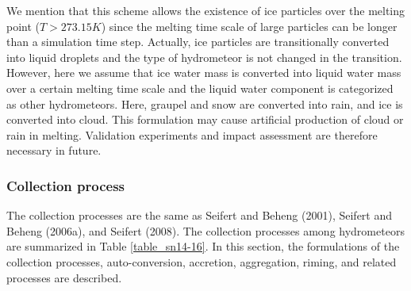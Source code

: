 We mention that this scheme allows the existence of ice particles over the melting point ($T>273.15 K$) since the melting time scale of large particles can be longer than a simulation time step. Actually, ice particles are transitionally converted into liquid droplets and the type of hydrometeor is not changed in the transition. However, here we assume that ice water mass is converted into liquid water mass over a certain melting time scale and the liquid water component is categorized as other hydrometeors. Here, graupel and snow are converted into rain, and ice is converted into cloud. This formulation may cause artificial production of cloud or rain in melting. Validation experiments and impact assessment are therefore necessary in future.

\subsubsection{Collection process}
The collection processes are the same as Seifert and Beheng (2001), Seifert and Beheng (2006a), and Seifert (2008). The collection processes among hydrometeors are summarized in Table \ref{table_sn14-16}. In this section, the formulations of the collection processes, auto-conversion, accretion, aggregation, riming, and related processes are described.


\begin{table}[h]
\begin{center}
\caption{Hydrometeors that result from binary collision. Collecting hydrometeors are written in the 1st row and collected hydrometeors are written in the 1st column.}
\label{table_sn14-16}
\end{center}
\end{table}

